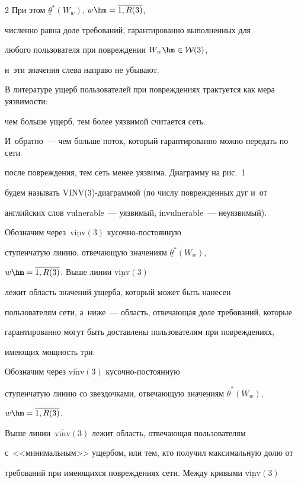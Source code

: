 \begin{multicols}{2}
При этом $\underline {\theta}^*(W_w)$, $w \hm= \overline{1, R(3)}$, 


численно равна доле требований, гарантированно выполненных для 


любого пользователя при повреждении $W_w \hm\in  {\cal W}(3)$,  


и~эти значения слева направо не убывают.





В литературе ущерб пользователей при по\-вреж\-де\-ни\-ях трактуется как мера уязвимости: 


чем больше ущерб, тем более уязвимой считается сеть. 


И~обратно~--- чем больше поток, который гарантированно можно передать по сети 


после повреждения, тем сеть менее уязвима. Диаграмму на рис.~1 


будем называть VINV(3)-диа\-грам\-мой (по числу поврежденных дуг и~от 


английских слов vulnerable~--- уязвимый, invulnerable~---  неуязвимый). 


Обозначим через~$\underline {\mathrm{vinv}}(3)$ ку\-соч\-но-по\-сто\-ян\-ную 


ступенчатую линию, отвечающую значениям $\underline {\theta}^*(W_w)$, 


$w \hm= \overline{1, R(3)}$. Выше линии  $\underline {\mathrm{vinv}}(3)$  


лежит область значений ущерба, который может быть нанесен 


пользователям сети, а~ниже~--- область, отвечающая доле требований, которые 


гарантированно могут быть до\-став\-ле\-ны пользователям при повреждениях,


 имеющих мощность три.





Обозначим через $\overline {\mathrm{vinv}}(3)$ ку\-соч\-но-по\-сто\-ян\-ную 


ступенчатую линию со звездочками, отвечающую значениям $\overline {\theta}^*(W_w)$, 


$w \hm= \overline{1, R(3)}$.


Выше линии~$\overline {\mathrm{vinv}}(3)$ лежит область, отвечающая пользователям 


с~<<минимальным>>  ущербом, или тем, кто получил максимальную долю от 


требований при имеющихся повреждениях сети. Между кривыми $\underline {\mathrm{vinv}}(3)$ 



\end{multicols}
